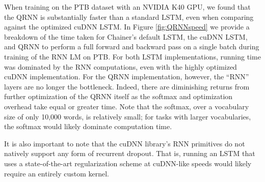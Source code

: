 \documentclass{article} %
\begin{document}
When training on the PTB dataset with an NVIDIA K40 GPU, we found that the QRNN is substantially faster than a standard LSTM, even when comparing against the optimized cuDNN LSTM.
In Figure \ref{fig:QRNNspeed} we provide a breakdown of the time taken for Chainer's default LSTM, the cuDNN LSTM, and QRNN to perform a full forward and backward pass on a single batch during training of the RNN LM on PTB.
For both LSTM implementations, running time was dominated by the RNN computations, even with the highly optimized cuDNN implementation.
For the QRNN implementation, however, the ``RNN'' layers are no longer the bottleneck.
Indeed, there are diminishing returns from further optimization of the QRNN itself as the softmax and optimization overhead take equal or greater time.
Note that the softmax, over a vocabulary size of only 10,000 words, is relatively small; for tasks with larger vocabularies, the softmax would likely dominate computation time.

It is also important to note that the cuDNN library's RNN primitives do not natively support any form of recurrent dropout. That is, running an LSTM that uses a state-of-the-art regularization scheme at cuDNN-like speeds would likely require an entirely custom kernel.
\end{document}
